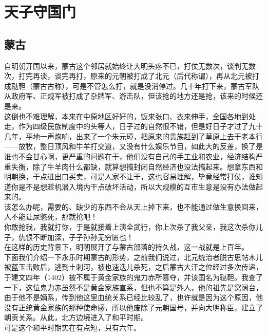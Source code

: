 \section{天子守国门}
\ifnum{}
	\begin{multicols}{\theparacolNo}
\fi
\subsection{蒙古}
自明朝开国以来，蒙古这个邻居就始终让大明头疼不已，打仗无数次，谈判无数次，打完再谈，谈完再打，原来的元朝被打成了北元（后代称谓），再从北元被打成鞑靼（蒙古古称），可是不管怎么打，就是没消停过。几十年打下来，蒙古军队从政府军、正规军被打成了杂牌军、游击队，但该抢的地方还是抢，该来的时候还是来。\\

这倒也不难理解，本来在中原地区好好的，饭来张口、衣来伸手，全国各地到处走，作为四级民族制度中的头等人，日子过的自然很不错，但是好日子才过了九十几年，平地一声炮响，出来了一个朱元璋，把原来的贵族赶到了草原上去干老本行——放牧，整日顶风和牛羊打交道，又没有什么娱乐节目，如此大的反差，换了是谁也不会甘心啊，更严重的问题在于，他们没有自己的手工业和农业，经济结构严重失衡，除了牛羊肉什么都缺，就算想搞封闭自然经济也没法搞起来。想拿东西和明朝换，干点进出口买卖，可是人家不让干，这也容易理解，毕竟经常打仗，谁知道你是不是想趁机潜入境内干点破坏活动，所以大规模的互市生意是没有办法做起来的。\\

该怎么办呢，需要的、缺少的东西不会从天上掉下来，也不能通过做生意换回来，人不能让尿憋死，那就抢吧！\\

你敢抢我，我就打你，于是就接着上演全武行，你上次杀了我父亲，我这次杀你儿子，仇恨不断加深，子子孙孙无穷匮也！\\

在这样的历史背景下，明朝展开了与蒙古部落的持久战，这一战就是上百年。\\

下面我们介绍一下永乐时期蒙古的形势，之前我们说过，北元统治者脱古思帖木儿被蓝玉击败后，逃到土刺河，被也速迭儿杀死，之后蒙古大汗之位经过多次传递，于建文四年（1402）被不属于黄金家族的鬼力赤所篡夺，并该国名为鞑靼。我查了一下，这位鬼力赤虽然不是黄金家族直系，但也不算是外人，他的祖先是窝阔台，由于他不是嫡系，传到他这里血统关系已经比较乱了，也许就是因为这个原因，他没有正统黄金家族的那种使命感，所以他废除了元朝国号，并向大明称臣，建立了朝贡关系。从此，北方边境进入了和平时期。\\

可是这个和平时期实在有点短，只有六年。\\


\end{multicols}

